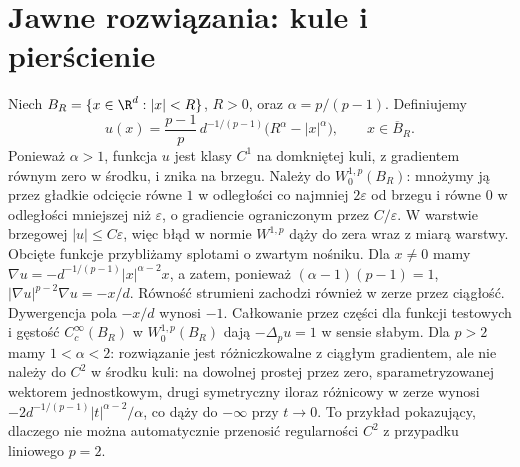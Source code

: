 \section{Jawne rozwiązania: kule i pierścienie}
\begin{przyklad}\label{ex:pde26-torsion}
Niech $B_R=\{x\in\R^d:|x|<R\}$, $R>0$, oraz
$\alpha=p/(p-1)$. Definiujemy
\begin{equation}\label{eq:pde26-torsion}
 u(x)=\frac{p-1}{p}\,d^{-1/(p-1)}
 \bigl(R^\alpha-|x|^\alpha\bigr),\qquad x\in\overline B_R.
\end{equation}
Ponieważ $\alpha>1$, funkcja $u$ jest klasy $C^1$
na domkniętej kuli, z gradientem równym zero w środku,
i znika na brzegu. Należy do $W_0^{1,p}(B_R)$:
mnożymy ją przez gładkie odcięcie równe $1$ w odległości
co najmniej $2\varepsilon$ od brzegu i równe $0$
w odległości mniejszej niż $\varepsilon$, o gradiencie
ograniczonym przez $C/\varepsilon$. W warstwie
brzegowej $|u|\le C\varepsilon$, więc błąd w normie
$W^{1,p}$ dąży do zera wraz z miarą warstwy.
Obcięte funkcje przybliżamy splotami o zwartym nośniku.
Dla $x\ne0$ mamy
$\nabla u=-d^{-1/(p-1)}|x|^{\alpha-2}x$, a zatem,
ponieważ $(\alpha-1)(p-1)=1$,
$|\nabla u|^{p-2}\nabla u=-x/d$.
Równość strumieni zachodzi również w zerze przez
ciągłość. Dywergencja pola $-x/d$ wynosi $-1$.
Całkowanie przez części dla funkcji testowych i
gęstość $C_c^\infty(B_R)$ w $W_0^{1,p}(B_R)$
dają $-\Delta_pu=1$ w sensie słabym.
Dla $p>2$ mamy $1<\alpha<2$:
rozwiązanie jest różniczkowalne z ciągłym gradientem,
ale nie należy do $C^2$ w środku kuli:
na dowolnej prostej przez zero, sparametryzowanej
wektorem jednostkowym, drugi symetryczny iloraz
różnicowy w zerze wynosi
$-2d^{-1/(p-1)}|t|^{\alpha-2}/\alpha$,
co dąży do $-\infty$ przy $t\to0$.
To przykład pokazujący, dlaczego nie można automatycznie
przenosić regularności $C^2$ z przypadku liniowego $p=2$.
\end{przyklad}

